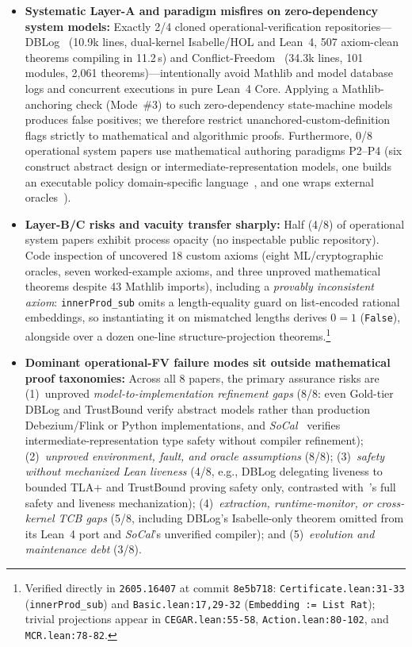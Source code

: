 \documentclass[11pt,letterpaper]{article}
\begin{document}
\begin{itemize}
  \item \textbf{Systematic Layer-A and paradigm misfires on zero-dependency system models:} Exactly 2/4 cloned operational-verification repositories---DBLog~\cite{arxiv2611_10810} (10.9k lines, dual-kernel Isabelle/HOL and Lean~4, 507 axiom-clean theorems compiling in 11.2\,s) and Conflict-Freedom~\cite{arxiv2605_19531} (34.3k lines, 101 modules, 2,061 theorems)---intentionally avoid Mathlib and model database logs and concurrent executions in pure Lean~4 Core. Applying a Mathlib-anchoring check (Mode~\#3) to such zero-dependency state-machine models produces false positives; we therefore restrict unanchored-custom-definition flags strictly to mathematical and algorithmic proofs. Furthermore, 0/8 operational system papers use mathematical authoring paradigms P2--P4 (six construct abstract design or intermediate-representation models, one builds an executable policy domain-specific language~\cite{arxiv2611_25599}, and one wraps external oracles~\cite{arxiv2605_16407}).
  \item \textbf{Layer-B/C risks and vacuity transfer sharply:} Half (4/8) of operational system papers exhibit process opacity (no inspectable public repository). Code inspection of \cite{arxiv2605_16407} uncovered 18 custom axioms (eight ML/cryptographic oracles, seven worked-example axioms, and three unproved mathematical theorems despite 43 Mathlib imports), including a \emph{provably inconsistent axiom}: \texttt{innerProd\_sub} omits a length-equality guard on list-encoded rational embeddings, so instantiating it on mismatched lengths derives $0 = 1$ (\texttt{False}), alongside over a dozen one-line structure-projection theorems.\footnote{Verified directly in \texttt{2605.16407} at commit \texttt{8e5b718}: \texttt{Certificate.lean:31-33} (\texttt{innerProd\_sub}) and \texttt{Basic.lean:17,29-32} (\texttt{Embedding := List Rat}); trivial projections appear in \texttt{CEGAR.lean:55-58}, \texttt{Action.lean:80-102}, and \texttt{MCR.lean:78-82}.}
  \item \textbf{Dominant operational-FV failure modes sit outside mathematical proof taxonomies:} Across all 8 papers, the primary assurance risks are (1)~unproved \emph{model-to-implementation refinement gaps} (8/8: even Gold-tier DBLog and TrustBound verify abstract models rather than production Debezium/Flink or Python implementations, and \emph{SoCal}~\cite{arxiv2605_01140} verifies intermediate-representation type safety without compiler refinement); (2)~\emph{unproved environment, fault, and oracle assumptions} (8/8); (3)~\emph{safety without mechanized Lean liveness} (4/8, e.g., DBLog delegating liveness to bounded TLA+ and TrustBound proving safety only, contrasted with~\cite{arxiv2605_19531}'s full safety and liveness mechanization); (4)~\emph{extraction, runtime-monitor, or cross-kernel TCB gaps} (5/8, including DBLog's Isabelle-only theorem omitted from its Lean~4 port and \emph{SoCal}'s unverified compiler); and (5)~\emph{evolution and maintenance debt} (3/8).
\end{itemize}
\end{document}
